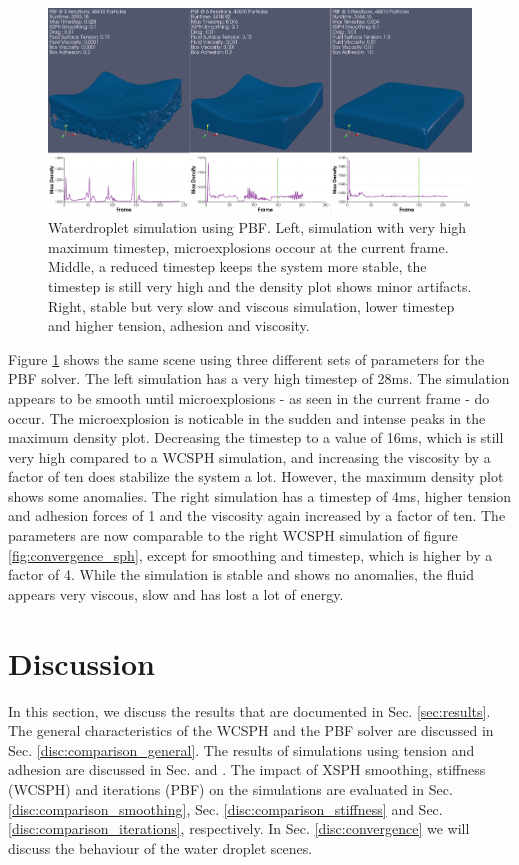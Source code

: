 \documentclass[11pt, letterpaper, twocolumn]{article}
\begin{document}
\begin{figure}[!b]
  \centering
  \includegraphics[width=\textwidth]{images/convergence_pbf.png}
  \caption{Waterdroplet simulation using PBF. Left, simulation with very high maximum timestep, microexplosions occour at the current frame. Middle, a reduced timestep keeps the system more stable, the timestep is still very high and the density plot shows minor artifacts. Right, stable but very slow and viscous simulation, lower timestep and higher tension, adhesion and viscosity. }
  \label{fig:convergence_pbf}
\end{figure}

Figure \ref{fig:convergence_pbf} shows the same scene using three different sets of parameters for the PBF solver. The left simulation has a very high timestep of 28ms. The simulation appears to be smooth until microexplosions - as seen in the current frame - do occur. The microexplosion is noticable in the sudden and intense peaks in the maximum density plot. Decreasing the timestep to a value of 16ms, which is still very high compared to a WCSPH simulation, and increasing the viscosity by a factor of ten does stabilize the system a lot. However, the maximum density plot shows some anomalies. The right simulation has a timestep of 4ms, higher tension and adhesion forces of 1 and the viscosity again increased by a factor of ten. The parameters are now comparable to the right WCSPH simulation of figure \ref{fig:convergence_sph}, except for smoothing and timestep, which is higher by a factor of 4. While the simulation is stable and shows no anomalies, the fluid appears very viscous, slow and has lost a lot of energy.



\section{Discussion}
\label{sec:discussion}
In this section, we discuss the results that are documented in Sec. \ref{sec:results}. The general characteristics of the WCSPH and the PBF solver are discussed in Sec. \ref{disc:comparison_general}. The results of simulations using tension and adhesion are discussed in Sec. \label{disc:comparison_tension} and \label{disc:comparison_adhesion}.
The impact of XSPH smoothing, stiffness (WCSPH) and iterations (PBF) on the simulations are evaluated in Sec. \ref{disc:comparison_smoothing}, Sec. \ref{disc:comparison_stiffness} and Sec. \ref{disc:comparison_iterations}, respectively. In Sec. \ref{disc:convergence} we will discuss the behaviour of the water droplet scenes. 
\end{document}
